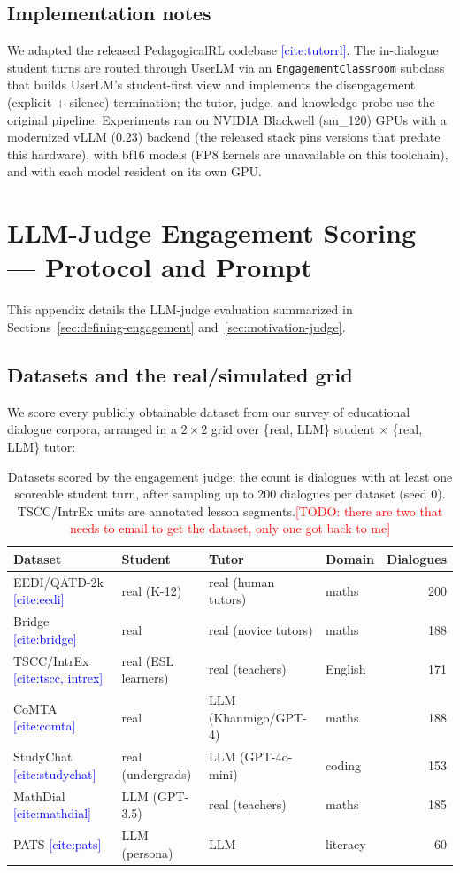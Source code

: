 \documentclass[11pt]{article}
\newcommand{\cit}[1]{\textcolor{blue}{[\textsf{cite:#1}]}}
\newcommand{\todo}[1]{\textcolor{red}{[TODO: #1]}}
\begin{document}
\subsection{Implementation notes}
We adapted the released PedagogicalRL codebase \cit{tutorrl}. The in-dialogue
student turns are routed through UserLM via an \texttt{EngagementClassroom}
subclass that builds UserLM's student-first view and implements the
disengagement (explicit + silence) termination; the tutor, judge, and knowledge
probe use the original pipeline. Experiments ran on NVIDIA Blackwell (sm\_120)
GPUs with a modernized vLLM (0.23) backend (the released stack pins versions that
predate this hardware), with bf16 models (FP8 kernels are unavailable on this
toolchain), and with each model resident on its own GPU. 

\section{LLM-Judge Engagement Scoring --- Protocol and Prompt}
\label{app:judge}

This appendix details the LLM-judge evaluation summarized in
Sections~\ref{sec:defining-engagement} and~\ref{sec:motivation-judge}.

\subsection{Datasets and the real/simulated grid}
\label{app:judge-datasets}

We score every publicly obtainable dataset from our survey of educational
dialogue corpora, arranged in a $2{\times}2$ grid over \{real, LLM\} student
$\times$ \{real, LLM\} tutor:

\begin{table}[h]
\centering
\small
\begin{tabular}{llllr}
\toprule
Dataset & Student & Tutor & Domain & Dialogues \\
\midrule
EEDI/QATD-2k \cit{eedi} & real (K-12) & real (human tutors) & maths & 200 \\
Bridge \cit{bridge} & real & real (novice tutors) & maths & 188 \\
TSCC/IntrEx \cit{tscc, intrex} & real (ESL learners) & real (teachers) & English & 171 \\
CoMTA \cit{comta} & real & LLM (Khanmigo/GPT-4) & maths & 188 \\
StudyChat \cit{studychat} & real (undergrads) & LLM (GPT-4o-mini) & coding & 153 \\
MathDial \cit{mathdial} & LLM (GPT-3.5) & real (teachers) & maths & 185 \\
PATS \cit{pats} & LLM (persona) & LLM & literacy & 60 \\
\bottomrule
\end{tabular}
\caption{Datasets scored by the engagement judge; the count is dialogues with at least one scoreable student turn, after sampling up to 200 dialogues per dataset (seed 0). 
TSCC/IntrEx units are annotated lesson segments.\todo{there are two that needs to email to get the dataset, only one got back to me}}
\label{tab:judge-datasets}
\end{table}
\end{document}

